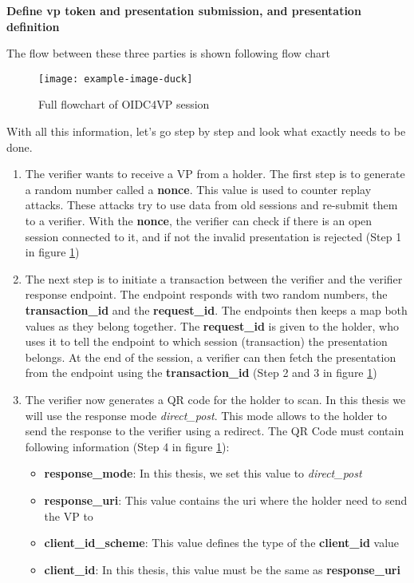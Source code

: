 \documentclass[
	a4paper               %
	,bibliography=totoc   %
	,listof=totoc         %
	,monolingual
]{bfhthesis}              %
\begin{document}
\textbf{Define vp token and presentation submission, and presentation definition}

The flow between these three parties is shown following flow chart
\begin{figure}[h]
	\centering
	\texttt{[image: example-image-duck]}
	\label{fig:flowoid}
	\caption{Full flowchart of OIDC4VP session}
\end{figure}

With all this information, let's go step by step and look what exactly needs to be done.

\begin{enumerate}
	\item The verifier wants to receive a VP from a holder. The first step is to generate a random number called a \textbf{nonce}. This value is used to counter replay attacks. These attacks try to use data from old sessions and re-submit them to a verifier. With the \textbf{nonce}, the verifier can check if there is an open session connected to it, and if not the invalid presentation is rejected (Step 1 in figure \ref{fig:flowoid})
	\item The next step is to initiate a transaction between the verifier and the verifier response endpoint. The endpoint responds with two random numbers, the \textbf{transaction\_id} and the \textbf{request\_id}. The endpoints then keeps a map both values as they belong together. The \textbf{request\_id} is given to the holder, who uses it to tell the endpoint to which session (transaction) the presentation belongs. At the end of the session, a verifier can then fetch the presentation from the endpoint using the \textbf{transaction\_id} (Step 2 and 3 in figure \ref{fig:flowoid})
	\item The verifier now generates a QR code for the holder to scan. In this thesis we will use the response mode \textit{direct\_post}. This mode allows to the holder to send the response to the verifier using a redirect. The QR Code must contain following information (Step 4 in figure \ref{fig:flowoid}):
	\begin{itemize}
		\item \textbf{response\_mode}: In this thesis, we set this value to \textit{direct\_post}
		\item \textbf{response\_uri}: This value contains the uri where the holder need to send the VP to
		\item \textbf{client\_id\_scheme}: This value defines the type of the \textbf{client\_id} value
		\item \textbf{client\_id}: In this thesis, this value must be the same as \textbf{response\_uri}

\end{itemize}
\end{enumerate}
\end{document}
